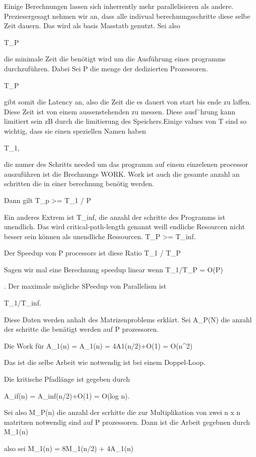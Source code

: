 Einige Berechnungen lassen sich inherrently mehr parallelisieren als andere. Preziesergesagt nehmen wir an, dass alle indivual berechnungsschritte diese selbe Zeit dauern. Das wird als basis Masstatb genutzt. Sei also

T_P 

die minimale Zeit die benötigt wird um die Ausführung eines programms durchzuführen. Dabei Sei P die menge der dedizierten Prozessoren. 

T_P

 gibt somit die Latency an, also die Zeit die es dauert von start bis ende zu laffen. Diese Zeit ist von einem aussenstehenden zu messen. Diese ausf¨hrung kann limitiert sein zB durch die limitierung des Speichers.Einige values von T sind so wichtig, dass sie einen speziellen Namen haben 

 T_1,

 die numer des Schritts needed um das programm auf einem einzelenen processor auszuführen ist die Brechnungs WORK. Work ist auch die gesamte anzahl an schritten die in einer berechnung benötig werden. 

Dann gilt T_p >= T_1 / P

Ein anderes Extrem ist 
T_inf, 
die anzahl der schritte des Programms ist unendlich. Das wird critical-path-length genannt weill endliche Resourcen nicht besser sein können als unendliche Ressourcen. 
T_P >= T_inf.


Der Speedup von P processors ist diese Ratio T_1 / T_P


Sagen wir mal eine Berechnung speedup linear wenn 
T_1/T_P = O(P)

. Der maximale mögliche SPeedup von Parallelism ist 

T_1/T_inf. 

Diese Daten werden anhalt des Matrizenproblems erklärt. Sei A_P(N) die anzahl der schritte die benätigt werden auf P prozessoren. 


Die Work für A_1(n) = A_1(n) = 4A1(n/2)+O(1) = O(n^2)

Das ist die selbe Arbeit wie notwendig ist bei einem Doppel-Loop.


Die kritische Pfadlänge ist gegeben durch 

A_if(n) = A_inf(n/2)+O(1) = O(log n).


Sei also M_P(n) die anzahl der scrhitte die zur Multiplikation von zwei n x n matritzen notwendig sind auf P prozessoren. Dann ist die Arbeit gegebnen durch M_1(n) 

also sei
M_1(n) = 8M_1(n/2) + 4A_1(n)

